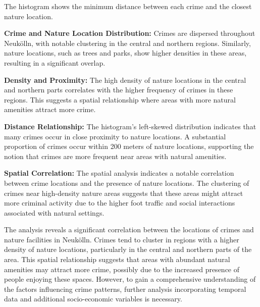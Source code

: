 The histogram shows the minimum distance between each crime and the closest nature location. 

\textbf{Crime and Nature Location Distribution:} Crimes are dispersed throughout Neukölln, with notable clustering in the central and northern regions. Similarly, nature locations, such as trees and parks, show higher densities in these areas, resulting in a significant overlap. 

\textbf{Density and Proximity:} The high density of nature locations in the central and northern parts correlates with the higher frequency of crimes in these regions. This suggests a spatial relationship where areas with more natural amenities attract more crime. 

\textbf{Distance Relationship:} The histogram's left-skewed distribution indicates that many crimes occur in close proximity to nature locations. A substantial proportion of crimes occur within 200 meters of nature locations, supporting the notion that crimes are more frequent near areas with natural amenities. 

\textbf{Spatial Correlation:} The spatial analysis indicates a notable correlation between crime locations and the presence of nature locations. The clustering of crimes near high-density nature areas suggests that these areas might attract more criminal activity due to the higher foot traffic and social interactions associated with natural settings. 

The analysis reveals a significant correlation between the locations of crimes and nature facilities in Neukölln. Crimes tend to cluster in regions with a higher density of nature locations, particularly in the central and northern parts of the area. This spatial relationship suggests that areas with abundant natural amenities may attract more crime, possibly due to the increased presence of people enjoying these spaces. However, to gain a comprehensive understanding of the factors influencing crime patterns, further analysis incorporating temporal data and additional socio-economic variables is necessary. 

